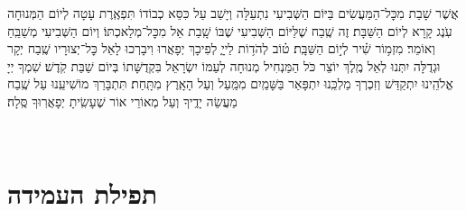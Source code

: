 אֲשֶׁר שָׁבַת מִכׇּל־הַמַּעֲשִׂים בַּיּוֹם הַשְּׁבִיעִי נִתְעַלָּה וְיָשַׁב עַל כִּסֵּא כְבוֹדוֹ \middot תִּפְאֶֽרֶת עָטָה לְיוֹם הַמְּנוּחָה עֹֽנֶג קָרָא לְיוֹם הַשַּׁבָּת׃
זֶה שֶֽׁבַח שֶׁלַּיּוֹם הַשְּׁבִיעִי שֶׁבּוֹ שָֽׁבַת אֵל מִכׇּל־מְלַאכְתּוֹ׃ וְיוֹם הַשְּׁבִיעִי מְשַׁבֵּֽחַ וְאוֹמֵר׃
%
מִזְמ֥וֹר שִׁ֗יר לְי֣וֹם הַשַּׁבָּֽת׃ ט֗וֹב לְהֹד֥וֹת לַייָ֑
לְפִיכָךְ יְפָאֲרוּ וִיבָרְכוּ לָאֵל כׇּל־יְצוּרָיו \middot שֶֽׁבַח יְקָר וּגְדֻלָּה יִתְּנוּ לְאֵל מֶֽלֶךְ יוֹצֵר כֹּל \middot הַמַּנְחִיל מְנוּחָה לְעַמּוֹ יִשְׂרָאֵל בִּקְדֻשָּׁתוֹ בְּיוֹם שַׁבַּת קֹֽדֶשׁ׃
שִׁמְךָ יְיָ אֱלֹהֵֽינוּ יִתְקַדַּשׁ \middot וְזִכְרְךָ מַלְכֵּֽנוּ יִתְפָּאַר בַּשָּׁמַֽיִם מִמַּֽעַל וְעַל הָאָֽרֶץ מִתָּֽחַת׃ תִּתְבָּרַךְ מוֹשִׁיעֵֽנוּ עַל שֶֽׁבַח מַעֲשֵׂה יָדֶֽיךָ וְעַל מְאוֹרֵי אוֹר שֶׁעָשִֽׂיתָ יְפָאֲרֽוּךָ סֶּֽלָה׃


\label{tisbarach}
\yotzerhameoros

\ahavaraba

\shema

\veahavta

\vehaya

\vayomer{}

\emesveyatziv

\ezrasavoseinu

\gaalyisroel\\


\section[תפילת העמידה]{ תפילת העמידה }

\nextpage
\begin{Center}\end{Center}

